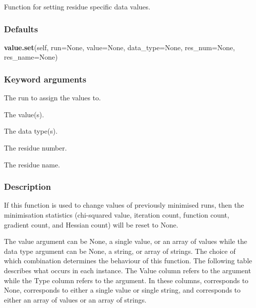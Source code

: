 Function for setting residue specific data values.

\subsubsection{Defaults}

\textsf{\textbf{value.set}(self, run=None, value=None, data\_type=None, res\_num=None, res\_name=None)}


\subsubsection{Keyword arguments}


  The run to assign the values to.

  The value(s).

  The data type(s).

  The residue number.

  The residue name.

\subsubsection{Description}

If this function is used to change values of previously minimised  runs, then the
minimisation  statistics (chi-squared value, iteration count, function count, gradient count,
and Hessian count) will be reset to None.


The value argument can be None, a single value, or an array of values while the data type
argument can be None, a string, or array of strings.  The choice of which combination
determines the behaviour of this function.  The following table describes what occurs in
each instance.  The Value column refers to the 
 argument while the Type column refers
to the 
 argument.  In these columns, 
 corresponds to None, 
 corresponds
to either a single value or single string, and 
 corresponds to either an array of values
or an array of strings.



